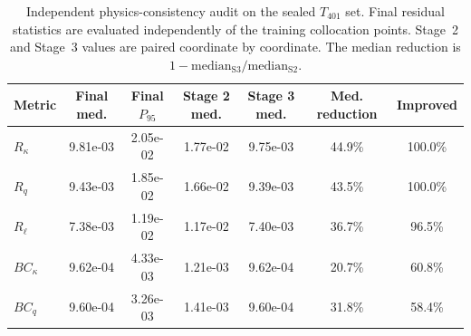 \begin{table}[t]
\centering
\caption{
Independent physics-consistency audit on the sealed $T_{401}$ set.
Final residual statistics are evaluated independently of the training
collocation points. Stage~2 and Stage~3 values are paired coordinate by
coordinate. The median reduction is
$1-\mathrm{median}_{\mathrm{S3}}/\mathrm{median}_{\mathrm{S2}}$.
}
\label{tab:independent_physics_consistency}
\small
\setlength{\tabcolsep}{4.5pt}
\begin{tabular}{lcccccc}
\toprule
Metric
& Final med.
& Final $P_{95}$
& Stage 2 med.
& Stage 3 med.
& Med. reduction
& Improved \\
\midrule
$R_\kappa$ & 9.81e-03 & 2.05e-02 & 1.77e-02 & 9.75e-03 & 44.9\% & 100.0\% \\
$R_q$ & 9.43e-03 & 1.85e-02 & 1.66e-02 & 9.39e-03 & 43.5\% & 100.0\% \\
$R_\ell$ & 7.38e-03 & 1.19e-02 & 1.17e-02 & 7.40e-03 & 36.7\% & 96.5\% \\
$BC_\kappa$ & 9.62e-04 & 4.33e-03 & 1.21e-03 & 9.62e-04 & 20.7\% & 60.8\% \\
$BC_q$ & 9.60e-04 & 3.26e-03 & 1.41e-03 & 9.60e-04 & 31.8\% & 58.4\% \\
\bottomrule
\end{tabular}
\end{table}
